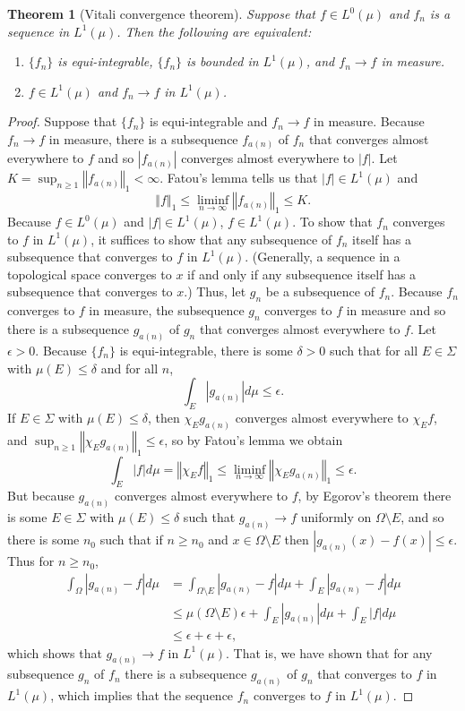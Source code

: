 \documentclass{article}
\newcommand{\norm}[1]{\left\Vert #1 \right\Vert}
\newtheorem{theorem}{Theorem}
\theoremstyle{definition}
\begin{document}
\begin{theorem}[Vitali convergence theorem]
Suppose that $f \in L^0(\mu)$ and $f_n$ is a sequence in $L^1(\mu)$. Then the following are equivalent:
\begin{enumerate}
\item $\{f_n\}$ is equi-integrable, $\{f_n\}$ is bounded in $L^1(\mu)$, and $f_n \to f$ in measure. 
\item $f \in L^1(\mu)$ and $f_n \to f$ in $L^1(\mu)$. 
\end{enumerate}
\end{theorem}
\begin{proof}
Suppose that $\{f_n\}$ is equi-integrable and $f_n \to f$ in measure.
Because $f_n \to f$ in measure, there is a subsequence $f_{a(n)}$ of $f_n$ that converges
almost everywhere to $f$ and so $|f_{a(n)}|$ converges almost everywhere to $|f|$.
Let
$K=\sup_{n \geq 1} \norm{f_{a(n)}}_1<\infty$. 
Fatou's lemma tells us that 
$|f| \in L^1(\mu)$ and
\[
\norm{f}_1 \leq \liminf_{n \to \infty} \norm{f_{a(n)}}_1 \leq K.
\]
Because $f \in L^0(\mu)$ and $|f| \in L^1(\mu)$, $f \in L^1(\mu)$. 
To show that $f_n$ converges to $f$ in $L^1(\mu)$, it suffices to show that
any subsequence of $f_n$ itself has a subsequence that converges to $f$ in $L^1(\mu)$. (Generally, a sequence in a topological space
converges to $x$ if and only if any subsequence itself has a subsequence that converges to $x$.)
Thus, let $g_n$ be a subsequence of $f_n$. Because $f_n$ converges to $f$ in measure, the subsequence $g_n$ converges
to $f$ in measure and so there is a subsequence $g_{a(n)}$ of $g_n$ that converges almost everywhere to $f$. 
Let $\epsilon>0$. Because $\{f_n\}$ is equi-integrable, there is some $\delta>0$ such that for all $E \in \Sigma$ with
$\mu(E) \leq \delta$ and for all $n$,
\[
\int_E |g_{a(n)}| d\mu \leq \epsilon.
\]
If $E \in \Sigma$ with $\mu(E) \leq \delta$, then $\chi_E g_{a(n)}$ converges almost
everywhere to $\chi_E f$, and $\sup_{n \geq 1} \norm{\chi_E g_{a(n)}}_1 \leq \epsilon$, so
by Fatou's lemma we obtain 
\[
\int_E |f| d\mu = \norm{\chi_E f}_1 \leq \liminf_{n \to \infty} \norm{\chi_E g_{a(n)}}_1
\leq \epsilon.
\]
But because $g_{a(n)}$ converges almost everywhere to $f$, 
by Egorov's theorem there is some $E \in \Sigma$ with $\mu(E) \leq \delta$ such that
$g_{a(n)} \to f$ uniformly on $\Omega \setminus E$, and so there is some $n_0$ such that
if $n \geq n_0$ and $x \in \Omega \setminus E$ then 
$|g_{a(n)}(x)-f(x)| \leq \epsilon$. Thus for $n \geq n_0$,
\begin{align*}
\int_\Omega |g_{a(n)}-f| d\mu&=
\int_{\Omega \setminus E} |g_{a(n)}-f| d\mu
+\int_E |g_{a(n)}-f| d\mu\\
&\leq \mu(\Omega \setminus E) \epsilon+\int_E |g_{a(n)}| d\mu
+\int_E |f| d\mu\\
&\leq \epsilon+\epsilon+\epsilon,
\end{align*}
which shows that $g_{a(n)} \to f$ in $L^1(\mu)$. That is, we have shown that for any subsequence
$g_n$ of $f_n$ there is a subsequence $g_{a(n)}$ of $g_n$ that converges to $f$ in $L^1(\mu)$, which implies that
the sequence $f_n$ converges to $f$ in $L^1(\mu)$. 


\end{proof}
\end{document}
